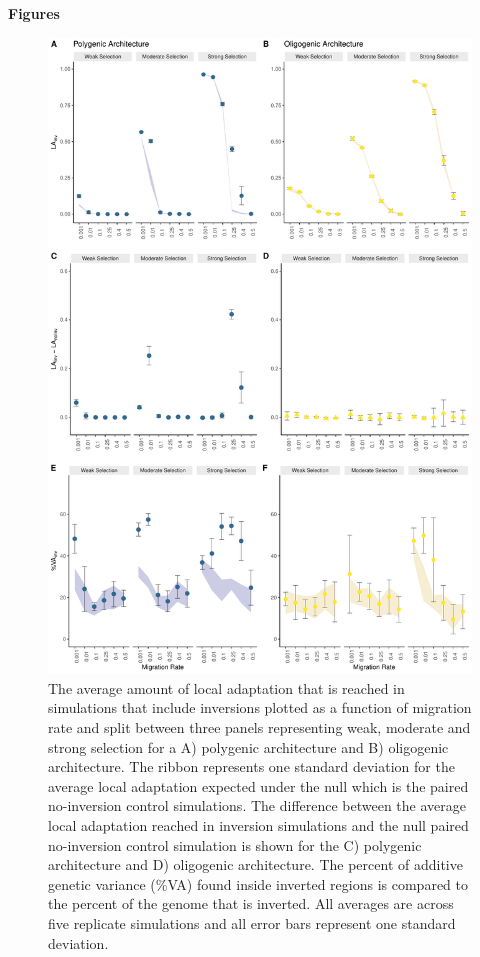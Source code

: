 \documentclass[10pt, oneside]{amsart}
\begin{document}
\pagecolor{white}

\begin{center}
{ \Large \bf Figures }
\end{center}

\listoffigures

\begin{figure}[h]
	\begin{center}
		\includegraphics[width = 4.5 in]{Fig1_LAplots.pdf}
	\end{center}
	\caption[Local Adaptation]{The average amount of local adaptation that is reached in simulations that include inversions plotted as a function of migration rate and split between three panels representing weak, moderate and strong selection for a A) polygenic architecture and B) oligogenic architecture. The ribbon represents one standard deviation for the average local adaptation expected under the null which is the paired no-inversion control simulations. The difference between the average local adaptation reached in inversion simulations and the null paired no-inversion control simulation is shown for the C) polygenic architecture and D) oligogenic architecture. The percent of additive genetic variance (\%VA) found inside inverted regions is compared to the percent of the genome that is inverted. All averages are across five replicate simulations and all error bars represent one standard deviation. }
\end{figure}
\end{document}
